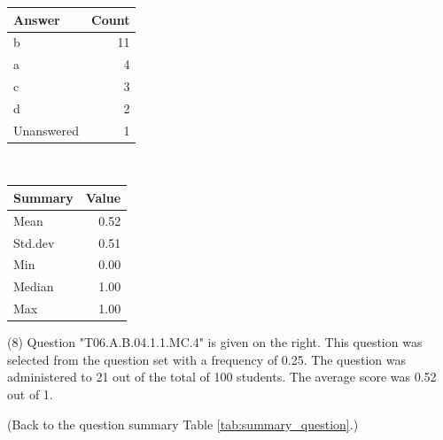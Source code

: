 \documentclass[12pt,nohyper]{tufte-handout}\usepackage[]{graphicx}\usepackage[]{color}
\begin{document}
\begin{center}%
\begin{tabular}{lr}
  \hline
Answer & Count \\ 
  \hline
b &  11 \\ 
  a &   4 \\ 
  c &   3 \\ 
  d &   2 \\ 
  Unanswered &   1 \\ 
   \hline
\end{tabular}
~~~~~~~~%
\begin{tabular}{lr}
  \hline
Summary & Value \\ 
  \hline
Mean & 0.52 \\ 
  Std.dev & 0.51 \\ 
  Min & 0.00 \\ 
  Median & 1.00 \\ 
  Max & 1.00 \\ 
   \hline
\end{tabular}
\end{center}\newpage{} (8) Question "T06.A.B.04.1.1.MC.4" is given on the right. This question was selected from the question set with a frequency of 0.25. The question was administered to 21 out of the total of 100 students. The average score was 0.52 out of 1.

 (Back to the question summary Table \ref{tab:summary_question}.)
\end{document}
